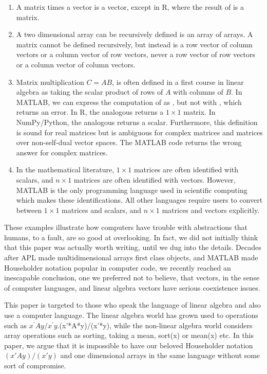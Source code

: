 \begin{enumerate}
\item
A matrix times a vector is a vector, except in R, where the result of  is a matrix.

\item
A two dimensional array can be recursively defined is an array of arrays. A matrix cannot be defined recursively, but instead is a row vector of column vectors or a column vector of row vectors, never a row vector of row vectors or a column vector of column vectors.

\item
Matrix multiplication $C=AB$, is often defined in a first course in linear algebra as taking the scalar product of rows of $A$ with columns of $B$.
In MATLAB, we can express the computation of  as , but not with , which returns an error.
In R, the analogous  returns a $1\times1$ matrix.
In NumPy/Python, the analogous  returns a scalar.
Furthermore, this definition is sound for real matrices but is ambiguous for complex matrices and matrices over non-self-dual vector spaces.
The MATLAB code  returns the wrong answer for complex matrices.

\item
In the mathematical literature, $1\times 1$ matrices are often identified with scalars, and $n\times 1$ matrices are often identified with vectors. However, MATLAB is the only programming language used in scientific computing which makes these identifications. All other languages require users to convert between $1\times 1$ matrices and scalars, and $n\times 1$ matrices and vectors explicitly.

\end{enumerate}


These examples illustrate how computers have trouble with abstractions that humans, to a fault, are so good at overlooking. In fact, we did not initially think that this paper was actually worth writing, until we dug into the details. Decades after APL made multidimensional arrays first class objects, and MATLAB made Householder notation popular in computer code, we recently reached an inescapable conclusion, one we preferred not to believe, that vectors, in the sense of computer languages, and linear algebra vectors have serious coexistence issues.

This paper is targeted to those who speak the language of linear algebra and
also use a computer language. The linear algebra world has grown used to
operations such as $x^\prime Ay/x^\prime y$.(x’*A*y)/(x’*y), while the
non-linear algebra world considers array operations such as sorting, taking a
mean, sort(x) or mean(x) etc. In this paper, we argue that it is impossible to
have our beloved Householder notation $(x'Ay)/(x'y)$ and one dimensional arrays
in the same language without some sort of compromise.


